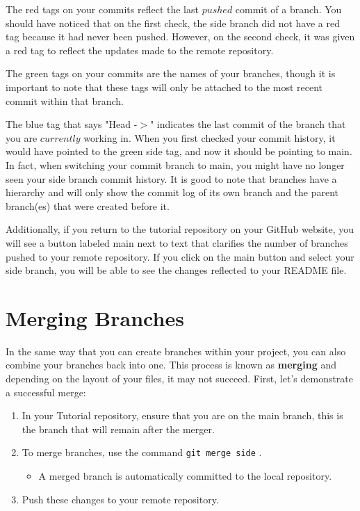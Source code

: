 \documentclass[10pt]{article}
\begin{document}
The red tags on your commits reflect the last $pushed$ commit of a branch. You should have noticed that on the first check, the side branch did not have a red tag because it had never been pushed. However, on the second check, it was given a red tag to reflect the updates made to the remote repository.

The green tags on your commits are the names of your branches, though it is important to note that these tags will only be attached to the most recent commit within that branch. 

The blue tag that says "Head -$>$" indicates the last commit of the branch that you are $currently$ working in. When you first checked your commit history, it would have pointed to the green side tag, and now it should be pointing to main. In fact, when switching your commit branch to main, you might have no longer seen your side branch commit history. It is good to note that branches have a hierarchy and will only show the commit log of its own branch and the parent branch(es) that were created before it.    

Additionally, if you return to the tutorial repository on your GitHub website, you will see a button labeled main next to text that clarifies the number of branches pushed to your remote repository. If you click on the main button and select your side branch, you will be able to see the changes reflected to your README file. 

\section{Merging Branches}

In the same way that you can create branches within your project, you can also combine your branches back into one. This process is known as \textbf{merging} and depending on the layout of your files, it may not succeed. First, let's demonstrate a successful merge:

\begin{enumerate}
\item In your Tutorial repository, ensure that you are on the main branch, this is the branch that will remain after the merger. 
\item To merge branches, use the command \texttt{git merge side} .
	\begin{itemize}
	\item A merged branch is automatically committed to the local repository. 
	\end{itemize}
\item Push these changes to your remote repository. 
\end{enumerate}
\end{document}
